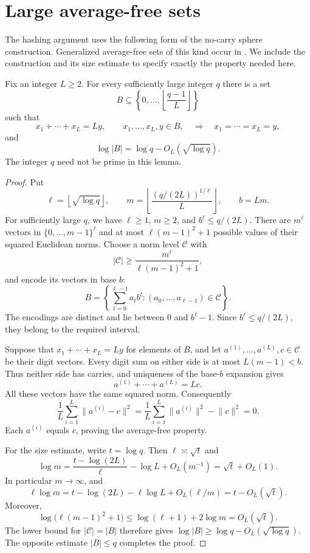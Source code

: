 \section{Large average-free sets}
\label{sec:average-free-sets}

The hashing argument uses the following form of the no-carry sphere
construction. Generalized average-free sets of this kind occur in
\cite{VC2015,CVZ2019}. We include the construction and its size estimate
to specify exactly the property needed here.

\begin{lemma}
\label{lem:average-free}
Fix an integer $L\geq 2$. For every sufficiently large integer $q$ there
is a set
\[
 B\subseteq\left\{0,\ldots,\left\lfloor\frac{q-1}{L}\right\rfloor\right\}
\]
such that
\[
 x_1+\cdots+x_L=Ly,\qquad x_1,\ldots,x_L,y\in B,
 \quad\Longrightarrow\quad x_1=\cdots=x_L=y,
\]
and
\[
 \log|B|=\log q-O_L\!\left(\sqrt{\log q}\right).
\]
The integer $q$ need not be prime in this lemma.
\end{lemma}

\begin{proof}
Put
\[
 \ell=\left\lfloor\sqrt{\log q}\right\rfloor,
 \qquad
 m=\left\lfloor\frac{(q/(2L))^{1/\ell}}{L}\right\rfloor,
 \qquad b=Lm.
\]
For sufficiently large $q$, we have $\ell\geq 1$, $m\geq 2$, and
$b^\ell\leq q/(2L)$. There are $m^\ell$ vectors in
$\{0,\ldots,m-1\}^{\ell}$ and at most $\ell(m-1)^2+1$ possible values
of their squared Euclidean norms. Choose a norm level $\mathcal C$
with
\[
 |\mathcal C|\geq\frac{m^\ell}{\ell(m-1)^2+1},
\]
and encode its vectors in base $b$:
\[
 B=\left\{\sum_{t=0}^{\ell-1}a_t b^t:
                (a_0,\ldots,a_{\ell-1})\in\mathcal C\right\}.
\]
The encodings are distinct and lie between $0$ and $b^\ell-1$.
Since $b^\ell\leq q/(2L)$, they belong to the required interval.

Suppose that $x_1+\cdots+x_L=Ly$ for elements of $B$, and let
$a^{(1)},\ldots,a^{(L)},c\in\mathcal C$ be their digit vectors.
Every digit sum on either side is at most $L(m-1)<b$. Thus neither
side has carries, and uniqueness of the base-$b$ expansion gives
\[
 a^{(1)}+\cdots+a^{(L)}=Lc.
\]
All these vectors have the same squared norm. Consequently
\[
 \frac1L\sum_{i=1}^L\lVert a^{(i)}-c\rVert^2
 =\frac1L\sum_{i=1}^L\lVert a^{(i)}\rVert^2-\lVert c\rVert^2
 =0.
\]
Each $a^{(i)}$ equals $c$, proving the average-free property.

For the size estimate, write $t=\log q$. Then $\ell\asymp\sqrt t$
and
\[
 \log m=\frac{t-\log(2L)}{\ell}-\log L+O_L(m^{-1})
       =\sqrt t+O_L(1).
\]
In particular $m\to\infty$, and
\[
 \ell\log m=t-\log(2L)-\ell\log L+O_L(\ell/m)
             =t-O_L(\sqrt t).
\]
Moreover,
\[
 \log\bigl(\ell(m-1)^2+1\bigr)
 \leq \log(\ell+1)+2\log m=O_L(\sqrt t).
\]
The lower bound for $|\mathcal C|=|B|$ therefore gives
$\log|B|\geq\log q-O_L(\sqrt{\log q})$. The opposite estimate
$|B|\leq q$ completes the proof.
\end{proof}

